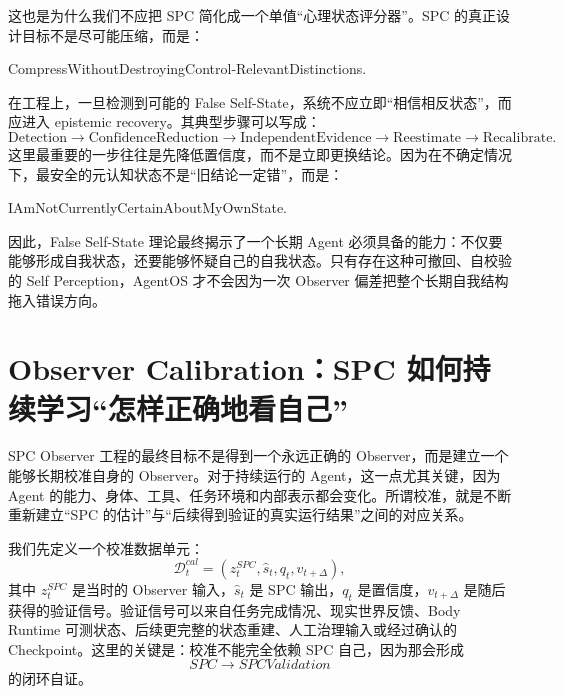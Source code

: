 这也是为什么我们不应把 SPC 简化成一个单值“心理状态评分器”。SPC 的真正设计目标不是尽可能压缩，而是：
\begin{statementbox}
CompressWithoutDestroyingControl-RelevantDistinctions.
\end{statementbox}

在工程上，一旦检测到可能的 False Self-State，系统不应立即“相信相反状态”，而应进入 epistemic recovery。其典型步骤可以写成：
\begin{equation}
\mathrm{Detection}
\rightarrow
\mathrm{ConfidenceReduction}
\rightarrow
\mathrm{IndependentEvidence}
\rightarrow
\mathrm{Reestimate}
\rightarrow
\mathrm{Recalibrate}.
\end{equation}
这里最重要的一步往往是先降低置信度，而不是立即更换结论。因为在不确定情况下，最安全的元认知状态不是“旧结论一定错”，而是：
\begin{statementbox}
IAmNotCurrentlyCertainAboutMyOwnState.
\end{statementbox}

因此，False Self-State 理论最终揭示了一个长期 Agent 必须具备的能力：不仅要能够形成自我状态，还要能够怀疑自己的自我状态。只有存在这种可撤回、自校验的 Self Perception，AgentOS 才不会因为一次 Observer 偏差把整个长期自我结构拖入错误方向。

\section{Observer Calibration：SPC 如何持续学习“怎样正确地看自己”}
\label{sec:spc-observer-calibration}

SPC Observer 工程的最终目标不是得到一个永远正确的 Observer，而是建立一个能够长期校准自身的 Observer。对于持续运行的 Agent，这一点尤其关键，因为 Agent 的能力、身体、工具、任务环境和内部表示都会变化。所谓校准，就是不断重新建立“SPC 的估计”与“后续得到验证的真实运行结果”之间的对应关系。

我们先定义一个校准数据单元：
\begin{equation}
\mathcal D_t^{cal}
=
\left(
z_t^{SPC},
\hat s_t,
q_t,
v_{t+\Delta}
\right),
\end{equation}
其中 $z_t^{SPC}$ 是当时的 Observer 输入，$\hat s_t$ 是 SPC 输出，$q_t$ 是置信度，$v_{t+\Delta}$ 是随后获得的验证信号。验证信号可以来自任务完成情况、现实世界反馈、Body Runtime 可测状态、后续更完整的状态重建、人工治理输入或经过确认的 Checkpoint。这里的关键是：校准不能完全依赖 SPC 自己，因为那会形成
\begin{equation}
SPC
\rightarrow
SPCValidation
\end{equation}
的闭环自证。

